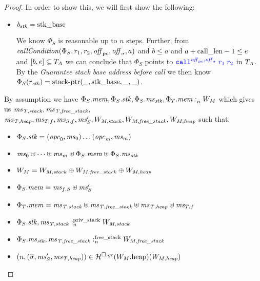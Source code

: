 \begin{proof}
  In order to show this, we will first show the following:
  \begin{itemize}
  \item $\baddr_\stk = \stkb$

    We know $\Phi_S$ is reasonable up to $n$ steps.
    Further, from $\callCond{\Phi_S,r_1,r_2,\offpc,\offsigma,a}$ and $b \leq a$ and $a + \calllen -1 \leq e$ and $[b,e] \subseteq \ta$ we can conclude that $\Phi_S$ points to $\src{\scall{\offpc,\offsigma}{r_1}{r_2}}$ in $\ta$.
    By the \emph{Guarantee stack base address before call} we then know $\Phi_S(r_\stk) = \stkptr{\_,\stkb,\_,\_}$.
  \end{itemize}

  By assumption we have
  $\memSat{\Phi_S.\mem,\Phi_S.\stk,\Phi_S.\ms_\stk,\Phi_T.\mem}{W_M}$ which
  gives us $\ms_\var{T,stack}, \ms_\var{T,free\_stack},$ $\ms_\var{T,heap},
  \ms_{T,f}, \ms_{S,f}, \ms_S', W_{M,\var{stack}}, W_{M,\var{free\_stack}},
  W_{M,\var{heap}}$ such that:
  \begin{itemize}
  \item $\Phi_S.\stk = (\opc_0, \ms_0) \dots (\opc_m,\ms_m)$
  \item $\ms_0 \uplus \dots \uplus \ms_m \uplus \Phi_S.\mem \uplus \Phi_S.\ms_\stk$
  \item $W_M = W_{M,\var{stack}} \oplus W_{M,\var{free\_stack}} \oplus W_{M,\var{heap}}$
  \item $\Phi_S.\mem = \ms_{f,S} \uplus \ms_S'$
  \item $\Phi_T.\mem = \ms_\var{T,stack} \uplus \ms_\var{T,free\_stack} \uplus
    \ms_\var{T,heap} \uplus \ms_{T,f}$
  \item $\memSatStack{\Phi_S.\stk,\ms_\var{T,stack}}{W_{M,\var{stack}}}$
  \item $\memSatFStack{\Phi_S.\ms_\stk,\ms_\var{T,free\_stack}}{W_{M,\var{free\_stack}}}$
  \item $\npair{(\overline{\sigma},\ms_S',\ms_\var{T,heap})} \in \lrheap(\pwheap[W_M])(W_{M,\var{heap}})$
  \end{itemize}


\end{proof}
